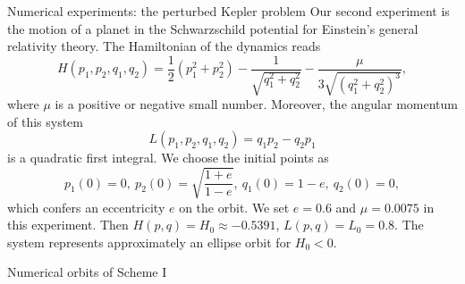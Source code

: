\documentclass[10pt]{beamer}
\begin{document}
\begin{frame}{Numerical experiments: the perturbed Kepler problem}
Our second experiment is the motion of a planet in the Schwarzschild potential for Einstein's general relativity theory. The Hamiltonian of the dynamics reads
\begin{equation*}
H(p_1,p_2,q_1,q_2)=\frac{1}{2}(p_1^2+p_2^2)-\frac{1}{\sqrt{q_1^2+q_2^2}}-\frac{\mu}{3\sqrt{(q_1^2+q_2^2)^3}},
\end{equation*}
where $\mu$ is a positive or negative small number. Moreover, the angular momentum of this system
\begin{equation*}
L(p_1,p_2,q_1,q_2)=q_1p_2-q_2p_1
\end{equation*}
is a quadratic first integral. We choose the initial points as
\[p_1(0)=0,\ p_2(0)=\sqrt{\frac{1+e}{1-e}},\ q_1(0)=1-e,\ q_2(0)=0,\]
which confers an eccentricity $e$ on the orbit. We set $e=0.6$ and $\mu=0.0075$ in this experiment. Then $H(p,q)=H_0\approx-0.5391$, $L(p,q)=L_0=0.8$. The system represents approximately an ellipse orbit for $H_0<0$.
\end{frame}

\begin{frame}{Numerical orbits of Scheme I}
\begin{figure}
\centering
{}\vspace{-1mm}
\vspace{-1mm}
\end{figure}
\end{frame}
\end{document}
